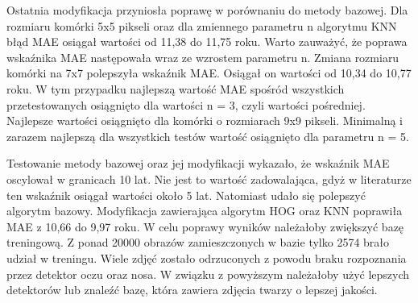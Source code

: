 \documentclass[a4paper,twoside,12pt]{book}
\newcounter{stronyPozaNumeracja}
\begin{document}
    Ostatnia modyfikacja przyniosła poprawę w porównaniu do metody bazowej.
    Dla rozmiaru komórki 5x5 pikseli oraz dla zmiennego parametru n algorytmu KNN błąd MAE osiągał wartości od 11,38 do
    11,75 roku. Warto zauważyć, że poprawa wskaźnika MAE następowała wraz ze wzrostem parametru n. Zmiana rozmiaru
    komórki na 7x7 polepszyła wskaźnik MAE. Osiągał on wartości od 10,34 do 10,77 roku. W tym przypadku najlepszą
    wartość MAE spośród wszystkich przetestowanych osiągnięto dla wartości n = 3, czyli wartości pośredniej.
    Najlepsze wartości osiągnięto dla komórki o rozmiarach 9x9 pikseli. Minimalną i zarazem najlepszą dla wszystkich testów wartość
    osiągnięto dla parametru n = 5.

    Testowanie metody bazowej oraz jej modyfikacji wykazało, że wskaźnik MAE oscylował w granicach 10 lat. Nie jest
    to wartość zadowalająca, gdyż w literaturze ten wskaźnik osiągał wartości około 5 lat. \cite{khryashchevGanin}
    Natomiast udało się polepszyć algorytm bazowy. Modyfikacja zawierająca algorytm HOG oraz KNN poprawiła MAE z 10,66 do
    9,97 roku. W celu poprawy wyników należałoby zwiększyć bazę treningową. Z ponad 20000 obrazów zamieszczonych w bazie tylko 2574
    brało udział w treningu. Wiele zdjęć zostało odrzuconych z powodu braku rozpoznania przez detektor oczu oraz nosa. W
    związku z powyższym należałoby użyć lepszych detektorów lub znaleźć bazę, która zawiera
    zdjęcia twarzy o lepszej jakości.


    \backmatter
    \setcounter{page}{\value{stronyPozaNumeracja}}

    \pagestyle{tylkoNumeryStron}

    
    

\end{document}
